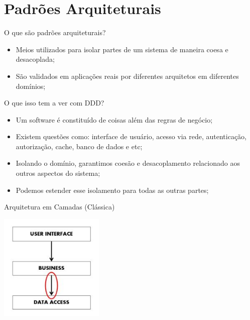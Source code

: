\documentclass[aspectratio=169]{beamer}
\begin{document}
\section{Padrões Arquiteturais}
\begin{frame}{O que são padrões arquiteturais?}	
	\begin{itemize}	
		\item Meios utilizados para isolar partes de um sistema de maneira coesa e desacoplada;
		\item São validados em aplicações reais por diferentes arquitetos em diferentes domínios;
	\end{itemize}
\end{frame}

\begin{frame}{O que isso tem a ver com DDD?}	
	\begin{itemize}	
		\item Um software é constituído de coisas além das regras de negócio;
		\item Existem questões como: interface de usuário, acesso via rede, autenticação, autorização, cache, banco de dados e etc;
		\item Isolando o domínio, garantimos coesão e desacoplamento relacionado aos outros aspectos do sistema;
		\item Podemos estender esse isolamento para todas as outras partes; 
	\end{itemize}
\end{frame}

\begin{frame}{Arquitetura em Camadas (Clássica)}	
	\begin{center}
		\includegraphics[width=5cm]{imgs/layered-architecture}
	\end{center}
\end{frame}
\end{document}
